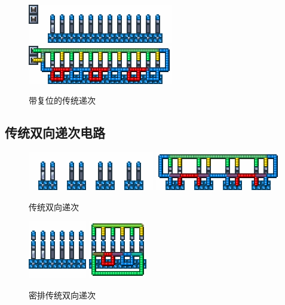 \begin{figure}
    \centering
    \includegraphics{images/106.png}
    \qquad
    \includegraphics{images/107.png}
    \caption{带复位的传统递次}
\end{figure}

\subsection{传统双向递次电路}\label{sec3}
\begin{figure}
    \centering
    \includegraphics{images/263.png}
    \qquad
    \includegraphics{images/264.png}
    \caption{传统双向递次}
\end{figure}
\begin{figure}
    \centering
    \includegraphics{images/261.png}
    \qquad
    \includegraphics{images/262.png}
    \caption{密排传统双向递次}
\end{figure}

